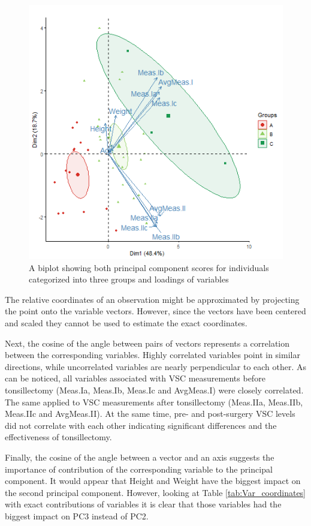 \documentclass[12pt,a4paper,notitlepage]{report}
\begin{document}
\begin{figure}[H]
	\centering
	\includegraphics[width=\textwidth, height=.91\textwidth]{./Figures/Fig_3.3.3}
	\caption{A biplot showing both principal component scores for individuals categorized into three groups and loadings of variables}
	\label{fig:Fig_3.3}
\end{figure}	


The relative coordinates of an observation might be approximated by projecting the point onto the variable vectors. However, since the vectors have been centered and scaled they cannot be used to estimate the exact coordinates.

Next, the cosine of the angle between pairs of vectors represents a correlation between the corresponding variables. Highly correlated variables point in similar directions, while uncorrelated variables are nearly perpendicular to each other. As can be noticed, all variables associated with VSC measurements before tonsillectomy (Meas.Ia, Meas.Ib, Meas.Ic and AvgMeas.I) were closely correlated. The same applied to VSC measurements after tonsillectomy (Meas.IIa, Meas.IIb, Meas.IIc and AvgMeas.II). At the same time, pre- and post-surgery VSC levels did not correlate with each other indicating significant differences and the effectiveness of tonsillectomy.
 
Finally, the cosine of the angle between a vector and an axis suggests the importance of contribution of the corresponding variable to the principal component. It would appear that Height and Weight have the biggest impact on the second principal component. However, looking at Table \ref{tab:Var_coordinates} with exact contributions of variables it is clear that those variables had the biggest impact on PC3 instead of PC2. 
    
\end{document}
